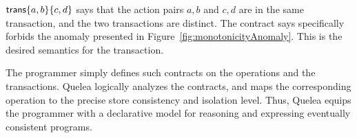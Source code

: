 ${\normalfont \textsf{trans}}\{a,b\}\{c,d\}$ says that the action pairs $a,b$ and $c,d$ are in the same
transaction, and the two transactions are distinct. The contract says
specifically forbids the anomaly presented in
Figure~\ref{fig:monotonicityAnomaly}. This is the desired semantics for the
 transaction.

The programmer simply defines such contracts on the operations and the
transactions. Quelea logically analyzes the contracts, and maps the
corresponding operation to the precise store consistency and isolation level.
Thus, Quelea equips the programmer with a declarative model for reasoning and
expressing eventually consistent programs.
